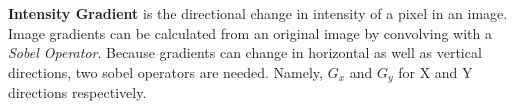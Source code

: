 
\section{}\label{section:mig}
\textbf{Intensity Gradient} is the directional change in intensity of a pixel in an image. Image gradients can be calculated from an original image by convolving with a \emph{Sobel Operator}. Because gradients can change in horizontal as well as vertical directions, two sobel operators are needed. Namely, $G_x$ and $G_y$ for X and Y directions respectively.

